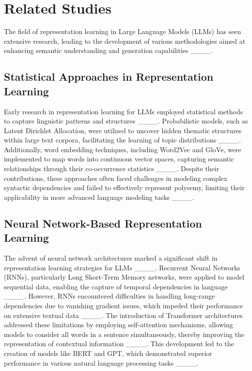 \section{Related Studies}
The field of representation learning in Large Language Models (LLMs) has seen extensive research, leading to the development of various methodologies aimed at enhancing semantic understanding and generation capabilities ____.

\subsection{Statistical Approaches in Representation Learning}

Early research in representation learning for LLMs employed statistical methods to capture linguistic patterns and structures ____. Probabilistic models, such as Latent Dirichlet Allocation, were utilized to uncover hidden thematic structures within large text corpora, facilitating the learning of topic distributions ____. Additionally, word embedding techniques, including Word2Vec and GloVe, were implemented to map words into continuous vector spaces, capturing semantic relationships through their co-occurrence statistics ____. Despite their contributions, these approaches often faced challenges in modeling complex syntactic dependencies and failed to effectively represent polysemy, limiting their applicability in more advanced language modeling tasks ____.

\subsection{Neural Network-Based Representation Learning}

The advent of neural network architectures marked a significant shift in representation learning strategies for LLMs ____. Recurrent Neural Networks (RNNs), particularly Long Short-Term Memory networks, were applied to model sequential data, enabling the capture of temporal dependencies in language ____. However, RNNs encountered difficulties in handling long-range dependencies due to vanishing gradient issues, which impeded their performance on extensive textual data ____. The introduction of Transformer architectures addressed these limitations by employing self-attention mechanisms, allowing models to consider all words in a sentence simultaneously, thereby improving the representation of contextual information ____. This development led to the creation of models like BERT and GPT, which demonstrated superior performance in various natural language processing tasks ____.

